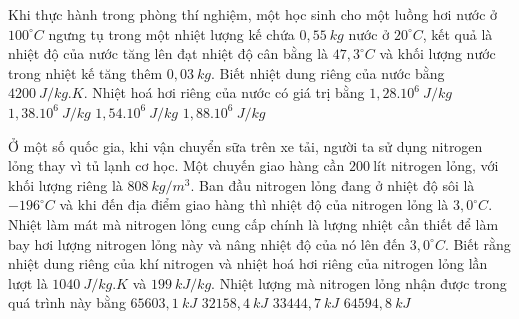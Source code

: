 \begin{ex}%
	Khi thực hành trong phòng thí nghiệm, một học sinh cho một luồng hơi nước ở $100^\circ C$ ngưng tụ trong một nhiệt lượng kế chứa $0,55\ kg$ nước ở $20^\circ C$, kết quả là nhiệt độ của nước tăng lên đạt nhiệt độ cân bằng là $47,3^\circ C$ và khối lượng nước trong nhiệt kế tăng thêm $0,03\ kg$. Biết nhiệt dung riêng của nước bằng $4200\ J/kg.K$. Nhiệt hoá hơi riêng của nước có giá trị bằng
	\choice
	{$1,28.10^6\ J/kg$}
	{$1,38.10^6\ J/kg$}
	{$1,54.10^6\ J/kg$}
	{\True $1,88.10^6\ J/kg$}
\end{ex}
\begin{ex}%
	Ở một số quốc gia, khi vận chuyển sữa trên xe tải, người ta sử dụng nitrogen lỏng thay vì tủ lạnh cơ học. Một chuyến giao hàng cần $200\ \text{lít}$ nitrogen lỏng, với khối lượng riêng là $808\ kg/m^3$. Ban đầu nitrogen lỏng đang ở nhiệt độ sôi là $-196^\circ C$ và khi đến địa điểm giao hàng thì nhiệt độ của nitrogen lỏng là $3,0^\circ C$. Nhiệt làm mát mà nitrogen lỏng cung cấp chính là lượng nhiệt cần thiết để làm bay hơi lượng nitrogen lỏng này và nâng nhiệt độ của nó lên đến $3,0^\circ C$. Biết rằng nhiệt dung riêng của khí nitrogen và nhiệt hoá hơi riêng của nitrogen lỏng lần lượt là $1040\ J/kg.K$ và $199\ kJ/kg.$ Nhiệt lượng mà nitrogen lỏng nhận được trong quá trình này bằng
	\choice
	{\True $65603,1\ kJ$}
	{$32158,4\ kJ$}
	{$33444,7\ kJ$}
	{$64594,8\ kJ$}
\end{ex}
